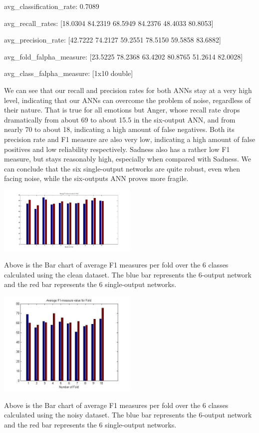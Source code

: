 \documentclass[a4wide, 11pt]{article}
\begin{document}
avg\_classification\_rate: 0.7089

avg\_recall\_rates: {[}18.0304 84.2319 68.5949 84.2376 48.4033 80.8053{]}

avg\_precision\_rate: {[}42.7222 74.2127 59.2551 78.5150 59.5858 83.6882{]}

avg\_fold\_falpha\_measure: {[}23.5225 78.2368 63.4202 80.8765 51.2614 82.0028{]}
   
avg\_class\_falpha\_measure: {[}1x10 double{]}

We can see that our recall and precision rates for both ANNs stay at a very high level, indicating that our ANNs can overcome the problem of noise, regardless of their nature. That is true for all emotions but Anger, whose recall rate drops dramatically from about 69 to about 15.5 in the six-output ANN, and from nearly 70 to about 18, indicating a high amount of false negatives. Both its precision rate and F1 measure are also very low, indicating a high amount of false positives and low reliability respectively. Sadness also has a rather low F1 measure, but stays reasonably high, especially when compared with Sadness. We can conclude that the six single-output networks are quite robust, even when facing noise, while the six-outputs ANN proves more fragile.

\begin{center}
\includegraphics[width=0.5\textwidth]{cleandata.jpg}
\end{center}
Above is the Bar chart of average F1 measures per fold over the 6 classes calculated using the clean dataset.  The blue bar represents the 6-output network and the red bar represents the 6 single-output networks.

\begin{center}
\includegraphics[width=0.5\textwidth]{noisydata.jpg}
\end{center}
Above is the Bar chart of average F1 measures per fold over the 6 classes calculated using the noisy dataset.   The blue bar represents the 6-output network and the red bar represents the 6 single-output networks.
\end{document}
